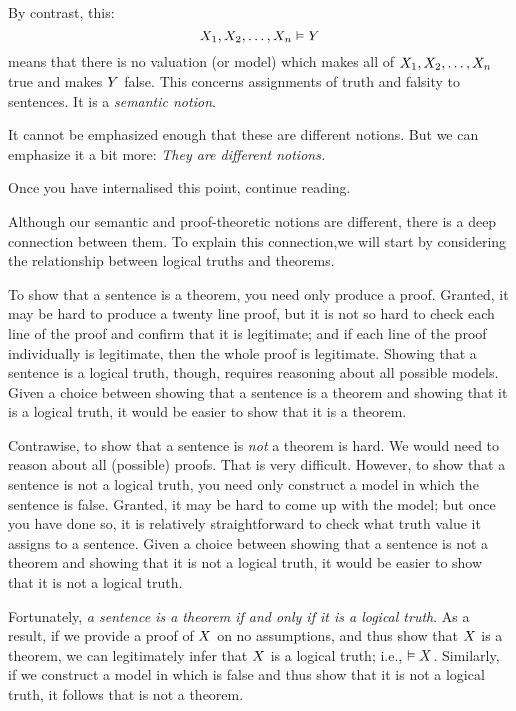 By contrast, this:
$$X_1, X_2, \ldots, X_n \vDash Y$$
means that there is no valuation (or model) which makes all of $X_1, X_2, \ldots, X_n$ true and makes $Y$ false. This concerns assignments of truth and falsity to sentences. It is a \emph{semantic notion}.

It cannot be emphasized enough that these are different notions. But we can emphasize it a bit more: \emph{They are different notions.}

Once you have internalised this point, continue reading.

Although our semantic and proof-theoretic notions are different, there is a deep connection between them. To explain this connection,we will start by considering the relationship between logical truths and theorems.

To show that a sentence is a theorem, you need only produce a proof. Granted, it may be hard to produce a twenty line proof, but it is not so hard to check each line of the proof and confirm that it is legitimate; and if each line of the proof individually is legitimate, then the whole proof is legitimate. Showing that a sentence is a logical truth, though, requires reasoning about all possible models. Given a choice between showing that a sentence is a theorem and showing that it is a logical truth, it would be easier to show that it is a theorem.

Contrawise, to show that a sentence is \emph{not} a theorem is hard. We would need to reason about all (possible) proofs. That is very difficult. However, to show that a sentence is not a logical truth, you need only construct a model in which the sentence is false. Granted, it may be hard to come up with the model; but once you have done so, it is relatively straightforward to check what truth value it assigns to a sentence. Given a choice between showing that a sentence is not a theorem and showing that it is not a logical truth, it would be easier to show that it is not a logical truth.

Fortunately, \emph{a sentence is a theorem if and only if it is a logical truth}. As a result, if we provide a proof of $X$ on no assumptions, and thus show that $X$ is a theorem, we can legitimately infer that $X$ is a logical truth; i.e., $\vDash X$. Similarly, if we construct a model in which \metaX is false and thus show that it is not a logical truth, it follows that \metaX is not a theorem.

